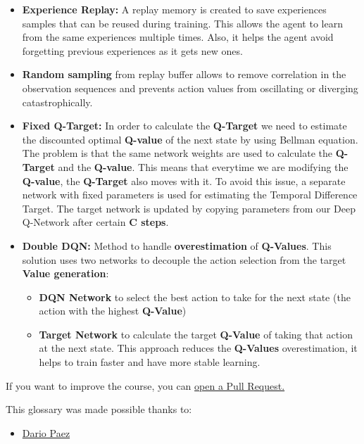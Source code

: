 \documentclass[11pt,a4paper]{article}
\begin{document}
\begin{itemize}
  \begin{itemize}
  \item
    \textbf{Experience Replay:} A replay memory is created to save experiences samples that can be reused during training. This allows the agent to learn from the same experiences multiple times. Also, it helps the agent avoid forgetting previous experiences as it gets new ones.
  \item
    \textbf{Random sampling} from replay buffer allows to remove correlation in the observation sequences and prevents action values from oscillating or diverging catastrophically.
  \item
    \textbf{Fixed Q-Target:} In order to calculate the \textbf{Q-Target} we need to estimate the discounted optimal \textbf{Q-value} of the next state by using Bellman equation. The problem is that the same network weights are used to calculate the \textbf{Q-Target} and the \textbf{Q-value}. This means that everytime we are modifying the \textbf{Q-value}, the \textbf{Q-Target} also moves with it. To avoid this issue, a separate network with fixed parameters is used for estimating the Temporal Difference Target. The target network is updated by copying parameters from our Deep Q-Network after certain \textbf{C steps}.
  \item
    \textbf{Double DQN:} Method to handle \textbf{overestimation} of \textbf{Q-Values}. This solution uses two networks to decouple the action selection from the target \textbf{Value generation}:

    \begin{itemize}
    \tightlist
    \item
      \textbf{DQN Network} to select the best action to take for the next state (the action with the highest \textbf{Q-Value})
    \item
      \textbf{Target Network} to calculate the target \textbf{Q-Value} of taking that action at the next state. This approach reduces the \textbf{Q-Values} overestimation, it helps to train faster and have more stable learning.
    \end{itemize}
  \end{itemize}
\end{itemize}

If you want to improve the course, you can \href{https://github.com/huggingface/deep-rl-class/pulls}{open a Pull Request.}

This glossary was made possible thanks to:

\begin{itemize}
\tightlist
\item
  \href{https://github.com/dario248}{Dario Paez}
\end{itemize}
\end{document}
